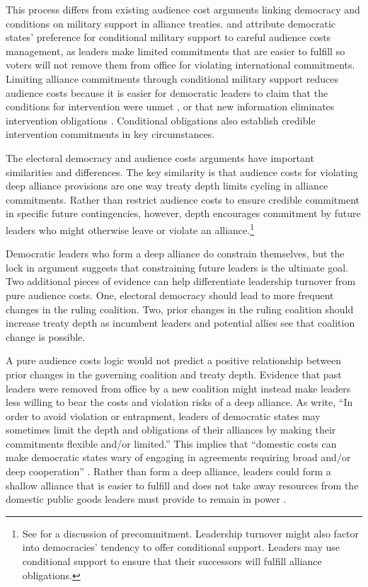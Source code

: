 \documentclass[12pt]{article}
\begin{document}
This process differs from existing audience cost arguments linking democracy and conditions on military support in alliance treaties. 
\citet{Mattes2012} and \citet{Chibaetal2015} attribute democratic states' preference for conditional military support to careful audience costs management, as leaders make limited commitments that are easier to fulfill so voters will not remove them from office for violating international commitments.
Limiting alliance commitments through conditional military support reduces audience costs because it is easier for democratic leaders to claim that the conditions for 
intervention were unmet \citep{FjelstulReiter2019}, or that new information eliminates intervention obligations \citep{LevenduskyHorowitz2012}. 
Conditional obligations also establish credible intervention commitments in key circumstances. 


The electoral democracy and audience costs arguments have important similarities and differences. 
The key similarity is that audience costs for violating deep alliance provisions are one way treaty depth limits cycling in alliance commitments. 
Rather than restrict audience costs to ensure credible commitment in specific future contingencies, however, depth encourages commitment by future leaders who might otherwise leave or violate an alliance.\footnote{See \citet{Mattes2012a} for a discussion of precommitment. Leadership turnover might also factor into democracies' tendency to offer conditional support. Leaders may use conditional support to ensure that their successors will fulfill alliance obligations.} 


Democratic leaders who form a deep alliance do constrain themselves, but the lock in argument suggests that constraining future leaders is the ultimate goal. 
Two additional pieces of evidence can help differentiate leadership turnover from pure audience costs. 
One, electoral democracy should lead to more frequent changes in the ruling coalition. 
Two, prior changes in the ruling coalition should increase treaty depth as incumbent leaders and potential allies see that coalition change is possible.  


A pure audience costs logic would not predict a positive relationship between prior changes in the governing coalition and treaty depth.
Evidence that past leaders were removed from office by a new coalition might instead make leaders less willing to bear the costs and violation risks of a deep alliance.
As \citet[pg. 972]{Chibaetal2015} write, ``In order to avoid violation or entrapment, leaders of democratic states may sometimes limit the depth and obligations of their alliances by making their commitments flexible and/or limited.''
This implies that ``domestic costs can make democratic states wary of engaging in agreements requiring broad and/or deep cooperation'' \citep[pg. 980]{Chibaetal2015}. 
Rather than form a deep alliance, leaders could form a shallow alliance that is easier to fulfill and does not take away resources from the domestic public goods leaders must provide to remain in power \citep{BDMetal2002}. 
\end{document}
